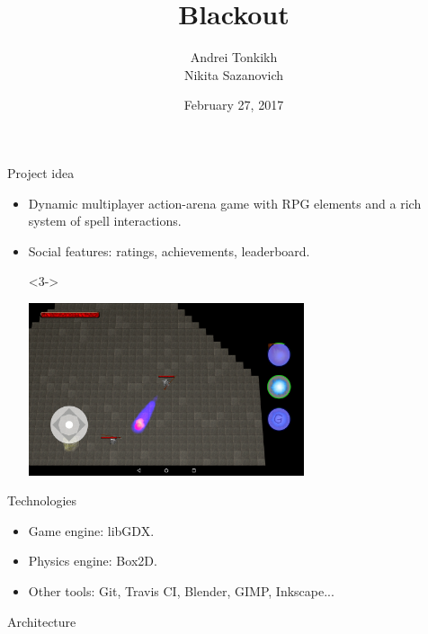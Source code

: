 \documentclass[12pt]{beamer}
\begin{document}
\title{Blackout}

\author[]{
    Andrei Tonkikh \\
    Nikita Sazanovich \\
}
\date{February 27, 2017}

\frame{\titlepage}


\begin{frame}{Project idea}
    \begin{itemize}
        \item <1-> Dynamic multiplayer action-arena game with RPG elements and a rich system of spell interactions.
	      \item <2-> Social features: ratings, achievements, leaderboard.
        \item[] <3-> \begin{center} \includegraphics[width=230pt]{screenshot.png} \end{center}
    \end{itemize}
\end{frame}


\begin{frame} {Technologies}
    \begin{itemize}
        \item Game engine: libGDX.
        \item Physics engine: Box2D.
        \item Other tools: Git, Travis CI, Blender, GIMP, Inkscape...
    \end{itemize}
\end{frame}



\begin{frame} {Architecture}
\noindent{}
\end{frame}
\end{document}
